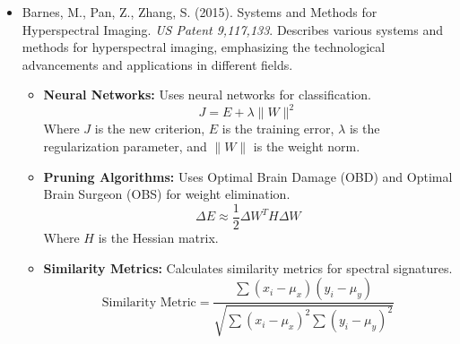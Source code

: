 \documentclass[10pt,svgnames,fragile]{beamer}
\begin{document}
\begin{frame}{}
\tiny
\begin{itemize}

    \item Barnes, M., Pan, Z., Zhang, S. (2015). Systems and Methods for Hyperspectral Imaging. \textit{US Patent 9,117,133}. \href{https://patents.google.com/patent/US9117133B2/en}{\color{blue}{DOI: 10.1109/TGRS.2015.2421060}}
    {\color{gray}Describes various systems and methods for hyperspectral imaging, emphasizing the technological advancements and applications in different fields.}
    \begin{itemize} \tiny
    \item \textbf{Neural Networks:} Uses neural networks for classification.
    \[
    J = E + \lambda \|W\|^2
    \]
    Where \( J \) is the new criterion, \( E \) is the training error, \( \lambda \) is the regularization parameter, and \( \|W\| \) is the weight norm.
    \item \textbf{Pruning Algorithms:} Uses Optimal Brain Damage (OBD) and Optimal Brain Surgeon (OBS) for weight elimination.
    \[
    \Delta E \approx \frac{1}{2} \Delta W^T H \Delta W
    \]
    Where \( H \) is the Hessian matrix.
    \item \textbf{Similarity Metrics:} Calculates similarity metrics for spectral signatures.
    \[
    \text{Similarity Metric} = \frac{\sum (x_i - \mu_x)(y_i - \mu_y)}{\sqrt{\sum (x_i - \mu_x)^2 \sum (y_i - \mu_y)^2}}
    \]
\end{itemize}

\end{itemize}
\end{frame}
\end{document}
